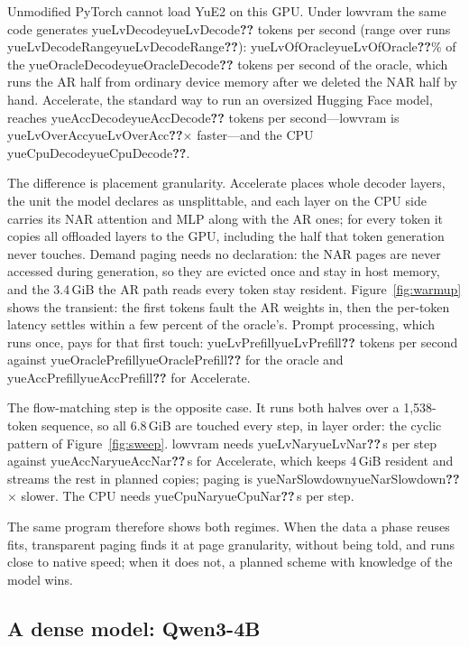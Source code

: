 \documentclass[11pt]{article}
\providecommand{\na}{\textbf{??}}
\newcommand{\num}[1]{\ifcsname #1\endcsname\csname #1\endcsname\else\na\fi}
\begin{document}
\begin{table}[h]
\centering\small

\caption{YuE2-3B, median over \num{yueRepeats} runs (CPU: one run).}
\label{tab:yue2}
\end{table}

Unmodified PyTorch cannot load YuE2 on this GPU. Under lowvram the same code generates
\num{yueLvDecode} tokens per second (range over runs \num{yueLvDecodeRange}): \num{yueLvOfOracle}\%
of the \num{yueOracleDecode} tokens per second of the oracle, which runs the AR half from ordinary
device memory after we deleted the NAR half by hand. Accelerate, the standard way to run an
oversized Hugging Face model, reaches \num{yueAccDecode} tokens per second---lowvram is
\num{yueLvOverAcc}$\times$ faster---and the CPU \num{yueCpuDecode}.

The difference is placement granularity. Accelerate places whole decoder layers, the unit the
model declares as unsplittable, and each layer on the CPU side carries its NAR attention and MLP
along with the AR ones; for every token it copies all offloaded layers to the GPU, including the
half that token generation never touches. Demand paging needs no declaration: the NAR pages are
never accessed during generation, so they are evicted once and stay in host memory, and the
3.4\,GiB the AR path reads every token stay resident. Figure~\ref{fig:warmup} shows the transient:
the first tokens fault the AR weights in, then the per-token latency settles within a few percent of
the oracle's. Prompt processing, which runs once, pays for that first touch: \num{yueLvPrefill}
tokens per second against \num{yueOraclePrefill} for the oracle and \num{yueAccPrefill} for
Accelerate.

The flow-matching step is the opposite case. It runs both halves over a 1,538-token sequence, so
all 6.8\,GiB are touched every step, in layer order: the cyclic pattern of
Figure~\ref{fig:sweep}. lowvram needs \num{yueLvNar}\,s per step against \num{yueAccNar}\,s for
Accelerate, which keeps 4\,GiB resident and streams the rest in planned copies; paging is
\num{yueNarSlowdown}$\times$ slower. The CPU needs \num{yueCpuNar}\,s per step.

The same program therefore shows both regimes. When the data a phase reuses fits, transparent
paging finds it at page granularity, without being told, and runs close to native speed; when it
does not, a planned scheme with knowledge of the model wins.

\subsection{A dense model: Qwen3-4B}
\end{document}
